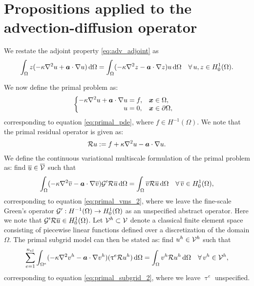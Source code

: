 \section{Propositions applied to the advection-diffusion operator}
\label{app:propositions}

We restate the adjoint property \eqref{eq:adv_adjoint} as
%
\begin{gather}
\int_{\Omega} z(-\kappa \nabla^2 {u} + \boldsymbol{a} \cdot \nabla {u}) \, \text{d} \Omega =
\int_{\Omega} (-\kappa \nabla^2 {z} - \boldsymbol{a} \cdot \nabla {z}) u \, \text{d} \Omega
\quad \forall \, u,z \in H^1_0(\Omega).
\label{eq:app_adjoint}
\end{gather}
%

We now define the primal problem as:
%
\begin{gather}
\begin{cases}
\begin{aligned}
-\kappa \nabla^2 {u} + \boldsymbol{a} \cdot \nabla {u} &= f, & & \boldsymbol{x} \in \Omega, \\
u &= 0, & & \boldsymbol{x} \in \partial \Omega,
\end{aligned}
\end{cases}
\label{eq:app_primal_pde}
\end{gather}
%
corresponding to equation \eqref{eq:primal_pde},
where $f \in H^{-1}(\Omega)$.
We note that the primal residual operator is given as:
%
\begin{gather}
\mathcal{R} u := f + \kappa \nabla^2 {u} - \boldsymbol{a} \cdot \nabla {u}.
\label{eq:app_primal_residual}
\end{gather}
We define the continuous variational multiscale formulation
of the primal problem as: find $\overline{u} \in \overline{\mathcal{V}}$ such that
%
\begin{gather}
\int_{\Omega} (-\kappa \nabla^2 {\overline{v}} - \boldsymbol{a} \cdot \nabla {\overline{v}}) \mathcal{G}' \mathcal{R} \overline{u} \, \text{d} \Omega =
\int_{\Omega} \overline{v} \mathcal{R} \overline{u} \, \text{d} \Omega
\quad \forall \, \overline{v} \in H^1_0(\Omega),
\label{eq:app_primal_vms}
\end{gather}
%
corresponding to equation \eqref{eq:primal_vms_2}, where we
leave the fine-scale Green's operator
$\mathcal{G}' : H^{-1}(\Omega) \to H^1_0(\Omega)$
as an unspecified
abstract operator.
Here we note that $\mathcal{G}' \mathcal{R} \overline{u} \in H^1_0(\Omega)$.
Let $\mathcal{V}^h \subset \mathcal{V}$ denote a classical finite element space consisting
of piecewise linear functions defined over a discretization of the
domain $\Omega$. The primal subgrid model can then be stated as: find
$u^h \in \mathcal{V}^h$ such that
%
\begin{gather}
\sum_{e=1}^{n_{el}} \int_{\Omega^e} (-\kappa \nabla^2 {v^h} - \boldsymbol{a} \cdot \nabla {v^h}) ( \uptau^e \mathcal{R} u^h)
\, \text{d} \Omega =
\int_{\Omega} v^h \mathcal{R} u^h \, \text{d} \Omega
\quad \forall \, v^h \in \mathcal{V}^h,
\label{eq:app_primal_subgrid}
\end{gather}
%
corresponding to equation \eqref{eq:primal_subgrid_2}, where we
leave $\uptau^e$ unspecified.

